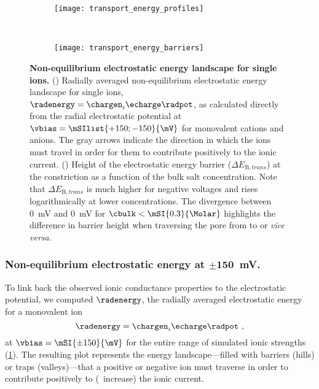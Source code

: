 %
\begin{figure}[p]
  \centering
  
  \begin{subfigure}[t]{11cm}
    \centering
    \caption{}\vspace{-5mm}\label{fig:transport_energy_profiles}
    \texttt{[image: transport\_energy\_profiles]}
  \end{subfigure}
  \\
  \begin{subfigure}[t]{9cm}
    \centering
    \caption{}\vspace{-3mm}\label{fig:transport_energy_barriers}
    \texttt{[image: transport\_energy\_barriers]}
  \end{subfigure}

  \caption[Non-equilibrium electrostatic energy landscape for single ions]%
  {%
    \textbf{Non-equilibrium electrostatic energy landscape for single ions.}
    ()
    Radially averaged non-equilibrium electrostatic energy landscape for single ions, $\radenergy =
    \chargen_{i} \echarge \radpot$, as calculated directly from the radial electrostatic potential at $\vbias
    = \mSIlist{+150;-150}{\mV}$ for monovalent cations and anions. The gray arrows indicate the direction in
    which the ions must travel in order for them to contribute positively to the ionic current.
    ()
    Height of the electrostatic energy barrier ($\Delta E_{\text{B},\mathit{trans}}$) at the \transi{}
    constriction as a function of the bulk salt concentration. Note that $\Delta E_{\text{B},\mathit{trans}}$
    is much higher for negative voltages and rises logarithmically at lower concentrations. The divergence
    between \SI[explicit-sign=+]{0}{\mV} and \SI[explicit-sign=-]{0}{\mV} for $\cbulk < \mSI{0.3}{\Molar}$
    highlights the difference in barrier height when traversing the pore from \cisi{} to \transi{} or
    \textit{vice versa}.
  }\label{fig:transport_energy}
\end{figure}
%

\subsubsection{Non-equilibrium electrostatic energy at $\mathbf{\pm150}$~mV.}
%

To link back the observed ionic conductance properties to the electrostatic potential, we computed
$\radenergy$, the radially averaged electrostatic energy for a monovalent ion
%
\begin{equation}\label{eq:epnp-ns_radenergy}
  \radenergy = \chargen_{i} \echarge \radpot
  \text{ ,}
\end{equation}
%
at $\vbias = \mSI{\pm150}{\mV}$ for the entire range of simulated ionic strengths
(\cref{fig:transport_energy_profiles}). The resulting plot represents the energy landscape---filled with
barriers (hills) or traps (valleys)---that a positive or negative ion must traverse in order to contribute
positively to (\ie~increase) the ionic current.

